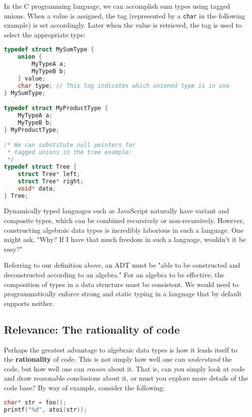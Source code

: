 \documentclass[12pt,a4paper]{article}
\begin{document}
		In the C programming language, we can accomplish sum types using tagged unions. When a value is assigned, the tag (represented by a \texttt{char} in the following example) is set accordingly. Later when the value is retrieved, the tag is used to select the appropriate type:
		
		\begin{lstlisting}[language=C]
typedef struct MySumType {
	union {
		MyTypeA a;
		MyTypeB b;
	} value;
	char type; // This tag indicates which unioned type is in use
} MySumType;

typedef struct MyProductType {
	MyTypeA a;
	MyTypeB b;
} MyProductType;

/* We can substitute null pointers for
 * tagged unions in the tree example:
 */
typedef struct Tree {
	struct Tree* left;
	struct Tree* right;
	void* data;
} Tree;
		\end{lstlisting}
		
		Dynamically typed languages such as JavaScript naturally have variant and composite types, which can be combined recursively or non-recursively. However, constructing algebraic data types is incredibly laborious in such a language. One might ask, "Why? If I have that much freedom in such a language, wouldn't it be easy?"
		
		Referring to our definition above, an ADT must be "able to be constructed and deconstructed according to an algebra." For an algebra to be effective, the composition of types in a data structure must be consistent. We would need to programmatically enforce strong and static typing in a language that by default supports neither.
		
		\subsection{Relevance: The rationality of code}
		
		Perhaps the greatest advantage to algebraic data types is how it lends itself to the \textbf{rationality} of code. This is not simply how well one can \textit{understand} the code, but how well one can \textit{reason} about it. That is, can you simply look at code and draw reasonable conclusions about it, or must you explore more details of the code base? By way of example, consider the following:
		
		\begin{lstlisting}[language=C]
char* str = foo();
printf("%d", atoi(str));
		\end{lstlisting}
		
\end{document}
